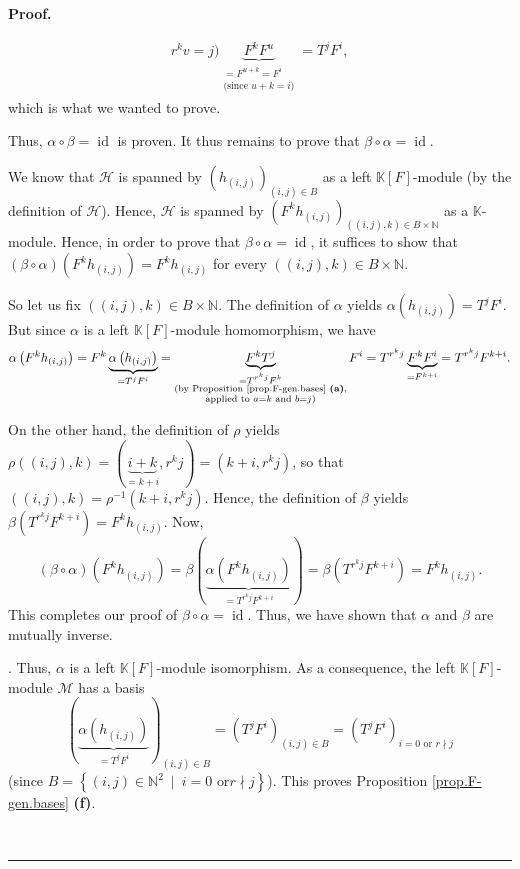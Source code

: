 \documentclass[numbers=enddot,12pt,final,onecolumn,notitlepage]{scrartcl}%
\theoremstyle{definition}
\newenvironment{proof}[1][Proof]{\noindent\textbf{#1.} }{\ \rule{0.5em}{0.5em}}
\begin{document}
\begin{proof}
{\begin{align*}
{{{}r^{k}v=j\text{)}}}\underbrace{F^{k}F^{u}}_{\substack{=F^{u+k}=F^{i}%
\\\text{(since }u+k=i\text{)}}}=T^{j}F^{i},
\end{align*}
which is what we wanted to prove.
\par
Thus, $\alpha\circ\beta=\operatorname*{id}$ is proven. It thus remains to
prove that $\beta\circ\alpha=\operatorname*{id}$.
\par
We know that $\mathcal{H}$ is spanned by $\left(  h_{\left(  i,j\right)
}\right)  _{\left(  i,j\right)  \in B}$ as a left $\mathbb{K}\left[  F\right]
$-module (by the definition of $\mathcal{H}$). Hence, $\mathcal{H}$ is spanned
by $\left(  F^{k}h_{\left(  i,j\right)  }\right)  _{\left(  \left(
i,j\right)  ,k\right)  \in B\times\mathbb{N}}$ as a $\mathbb{K}$-module.
Hence, in order to prove that $\beta\circ\alpha=\operatorname*{id}$, it
suffices to show that $\left(  \beta\circ\alpha\right)  \left(  F^{k}%
h_{\left(  i,j\right)  }\right)  =F^{k}h_{\left(  i,j\right)  }$ for every
$\left(  \left(  i,j\right)  ,k\right)  \in B\times\mathbb{N}$.
\par
So let us fix $\left(  \left(  i,j\right)  ,k\right)  \in B\times\mathbb{N}$.
The definition of $\alpha$ yields $\alpha\left(  h_{\left(  i,j\right)
}\right)  =T^{j}F^{i}$. But since $\alpha$ is a left $\mathbb{K}\left[
F\right]  $-module homomorphism, we have%
\[
\alpha\left(  F^{k}h_{\left(  i,j\right)  }\right)  =F^{k}\underbrace{\alpha
\left(  h_{\left(  i,j\right)  }\right)  }_{=T^{j}F^{i}}=\underbrace{F^{k}%
T^{j}}_{\substack{=T^{r^{k}j}F^{k}\\\text{(by Proposition
\ref{prop.F-gen.bases} \textbf{(a)},}\\\text{applied to }a=k\text{ and
}b=j\text{)}}}F^{i}=T^{r^{k}j}\underbrace{F^{k}F^{i}}_{=F^{k+i}}=T^{r^{k}%
j}F^{k+i}.
\]
\par
On the other hand, the definition of $\rho$ yields $\rho\left(  \left(
i,j\right)  ,k\right)  =\left(  \underbrace{i+k}_{=k+i},r^{k}j\right)
=\left(  k+i,r^{k}j\right)  $, so that $\left(  \left(  i,j\right)  ,k\right)
=\rho^{-1}\left(  k+i,r^{k}j\right)  $. Hence, the definition of $\beta$
yields $\beta\left(  T^{r^{k}j}F^{k+i}\right)  =F^{k}h_{\left(  i,j\right)  }%
$. Now,%
\[
\left(  \beta\circ\alpha\right)  \left(  F^{k}h_{\left(  i,j\right)  }\right)
=\beta\left(  \underbrace{\alpha\left(  F^{k}h_{\left(  i,j\right)  }\right)
}_{=T^{r^{k}j}F^{k+i}}\right)  =\beta\left(  T^{r^{k}j}F^{k+i}\right)
=F^{k}h_{\left(  i,j\right)  }.
\]
This completes our proof of $\beta\circ\alpha=\operatorname*{id}$. Thus, we
have shown that $\alpha$ and $\beta$ are mutually inverse.}. Thus, $\alpha$ is
a left $\mathbb{K}\left[  F\right]  $-module isomorphism. As a consequence,
the left $\mathbb{K}\left[  F\right]  $-module $\mathcal{M}$ has a basis
\[
\left(  \underbrace{\alpha\left(  h_{\left(  i,j\right)  }\right)  }%
_{=T^{j}F^{i}}\right)  _{\left(  i,j\right)  \in B}=\left(  T^{j}F^{i}\right)
_{\left(  i,j\right)  \in B}=\left(  T^{j}F^{i}\right)  _{i=0\text{ or }r\nmid
j}%
\]
(since $B=\left\{  \left(  i,j\right)  \in\mathbb{N}^{2}\ \mid\ i=0\text{ or
}r\nmid j\right\}  $). This proves Proposition \ref{prop.F-gen.bases}
\textbf{(f)}.


\end{proof}
\end{document}
